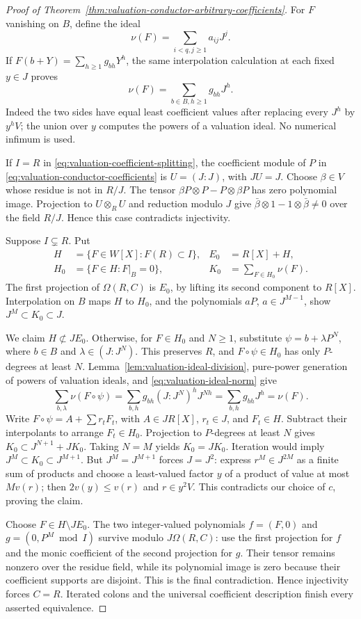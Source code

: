 \begin{proof}[Proof of Theorem~\ref{thm:valuation-conductor-arbitrary-coefficients}]
For $F$ vanishing on $B$, define the ideal
\[
              \nu(F)=\sum_{i<q,j\ge1}a_{ij}J^j.
\]
If $F(b+Y)=\sum_{h\ge1}g_{bh}Y^h$, the same interpolation calculation
at each fixed $y\in J$ proves
\begin{equation}\label{eq:valuation-ideal-norm}
                         \nu(F)=\sum_{b\in B,h\ge1}g_{bh}J^h.
\end{equation}
Indeed the two sides have equal least coefficient values after
replacing every $J^h$ by $y^hV$; the union over $y$ computes the
powers of a valuation ideal. No numerical infimum is used.

If $I=R$ in \eqref{eq:valuation-coefficient-splitting}, the coefficient
module of $P$ in \eqref{eq:valuation-conductor-coefficients} is
$U=(J:J)$, with $JU=J$. Choose $\beta\in V$ whose residue is not in
$R/J$. The tensor $\beta P\otimes P-P\otimes\beta P$ has zero
polynomial image. Projection to $U\otimes_RU$ and reduction modulo
$J$ give $\bar\beta\otimes1-1\otimes\bar\beta\ne0$ over the field
$R/J$. Hence this case contradicts injectivity.

Suppose $I\subsetneq R$. Put
\[
\begin{aligned}
 H&=\{F\in W[X]:F(R)\subset I\},& E_0&=R[X]+H,\\
 H_0&=\{F\in H:F|_B=0\},& K_0&=\sum_{F\in H_0}\nu(F).
\end{aligned}
\]
The first projection of $\Omega(R,C)$ is $E_0$, by lifting its
second component to $R[X]$. Interpolation on $B$ maps $H$ to $H_0$,
and the polynomials $aP$, $a\in J^{M-1}$, show
$J^M\subset K_0\subset J$.

We claim $H\not\subset JE_0$. Otherwise, for $F\in H_0$ and
$N\ge1$, substitute
$\psi=b+\lambda P^N$, where $b\in B$ and $\lambda\in(J:J^N)$.
This preserves $R$, and $F\circ\psi\in H_0$ has only $P$-degrees
at least $N$. Lemma~\ref{lem:valuation-ideal-division}, pure-power
generation of powers of valuation ideals, and
\eqref{eq:valuation-ideal-norm} give
\[
 \sum_{b,\lambda}\nu(F\circ\psi)
   =\sum_{b,h}g_{bh}(J:J^N)^hJ^{Nh}
   =\sum_{b,h}g_{bh}J^h=\nu(F).
\]
Write $F\circ\psi=A+\sum r_tF_t$, with $A\in JR[X]$, $r_t\in J$,
and $F_t\in H$. Subtract their interpolants to arrange $F_t\in H_0$.
Projection to $P$-degrees at least $N$ gives
$K_0\subset J^{N+1}+JK_0$. Taking $N=M$ yields $K_0=JK_0$.
Iteration would imply $J^M\subset K_0\subset J^{M+1}$.
But $J^M=J^{M+1}$ forces $J=J^2$: express $r^M\in J^{2M}$ as a
finite sum of products and choose a least-valued factor $y$ of a
product of value at most $Mv(r)$; then $2v(y)\le v(r)$ and
$r\in y^2V$. This contradicts our choice of $c$, proving the claim.

Choose $F\in H\setminus JE_0$. The two integer-valued polynomials
$f=(F,0)$ and $g=(0,P^M\bmod I)$ survive modulo $J\Omega(R,C)$:
use the first projection for $f$ and the monic coefficient of the
second projection for $g$. Their tensor remains nonzero over the
residue field, while its polynomial image is zero because their
coefficient supports are disjoint. This is the final contradiction.
Hence injectivity forces $C=R$. Iterated colons and the universal
coefficient description finish every asserted equivalence.
\end{proof}
